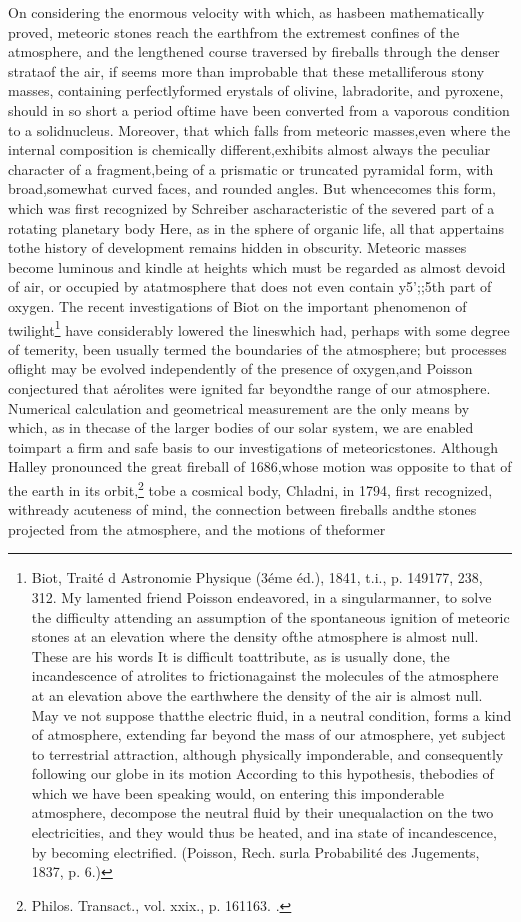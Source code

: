 On considering the enormous velocity with which, as hasbeen mathematically proved, meteoric stones reach the earthfrom the extremest confines of the atmosphere, and the lengthened course traversed by fireballs through the denser strataof the air, if seems more than improbable that these metalliferous stony masses, containing perfectlyformed erystals of olivine, labradorite, and pyroxene, should in so short a period oftime have been converted from a vaporous condition to a solidnucleus. Moreover, that which falls from meteoric masses,even where the internal composition is chemically different,exhibits almost always the peculiar character of a fragment,being of a prismatic or truncated pyramidal form, with broad,somewhat curved faces, and rounded angles. But whencecomes this form, which was first recognized by Schreiber ascharacteristic of the severed part of a rotating planetary body Here, as in the sphere of organic life, all that appertains tothe history of development remains hidden in obscurity. Meteoric masses become luminous and kindle at heights which must be regarded as almost devoid of air, or occupied by atatmosphere that does not even contain y5';;5th part of oxygen. The recent investigations of Biot on the important phenomenon of twilight\footnote{Biot, Trait\'{e} d Astronomie Physique (3\'{e}me \'{e}d.), 1841, t.i., p. 149177, 238, 312. My lamented friend Poisson endeavored, in a singularmanner, to solve the difficulty attending an assumption of the spontaneous ignition of meteoric stones at an elevation where the density ofthe atmosphere is almost null. These are his words It is difficult toattribute, as is usually done, the incandescence of atrolites to frictionagainst the molecules of the atmosphere at an elevation above the earthwhere the density of the air is almost null. May ve not suppose thatthe electric fluid, in a neutral condition, forms a kind of atmosphere, extending far beyond the mass of our atmosphere, yet subject to terrestrial attraction, although physically imponderable, and consequently following our globe in its motion According to this hypothesis, thebodies of which we have been speaking would, on entering this imponderable atmosphere, decompose the neutral fluid by their unequalaction on the two electricities, and they would thus be heated, and ina state of incandescence, by becoming electrified. (Poisson, Rech. surla Probabilit\'{e} des Jugements, 1837, p. 6.)} have considerably lowered the lineswhich had, perhaps with some degree of temerity, been usually termed the boundaries of the atmosphere; but processes oflight may be evolved independently of the presence of oxygen,and Poisson conjectured that a\'{e}rolites were ignited far beyondthe range of our atmosphere. Numerical calculation and geometrical measurement are the only means by which, as in thecase of the larger bodies of our solar system, we are enabled toimpart a firm and safe basis to our investigations of meteoricstones. Although Halley pronounced the great fireball of 1686,whose motion was opposite to that of the earth in its orbit,\footnote{Philos. Transact., vol. xxix., p. 161163. .} tobe a cosmical body, Chladni, in 1794, first recognized, withready acuteness of mind, the connection between fireballs andthe stones projected from the atmosphere, and the motions of theformer 